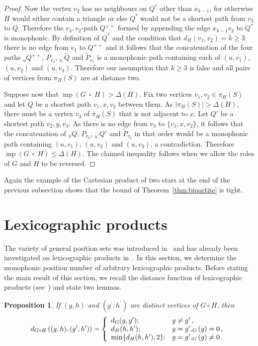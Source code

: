 \documentclass[12pt]{article}
\newtheorem{proposition}[theorem]{Proposition}
\DeclareMathOperator {\mono} {mp}
\let\deg\relax
\DeclareMathOperator {\deg} {deg}
\DeclareMathOperator{\cp}{\,\square\,}
\begin{document}
\begin{proof}
Now the vertex $v_2$ has no neighbours on $Q^*$ other than $x_{k-1}$, for otherwise $H$ would either contain a triangle or else $Q^*$ would not be a shortest path from $v_3$ to $Q$. Therefore the $v_3,v_2$-path $Q^{++}$ formed by appending the edge $x_{k-1}v_2$ to $Q^*$ is monophonic. By definition of $Q^*$ and the condition that $d_H(v_1,v_2) = k \geq 3$ there is no edge from $v_1$ to $Q^{++}$ and it follows that the concatenation of the four paths $_uQ^{++}$, $P_{v_2}$, $_{u^{\prime }}\widetilde{Q}$ and $\widetilde{P}_{v_1}$ is a monophonic path containing each of $(u,v_1)$, $(u,v_2)$ and $(u,v_3)$. Therefore our assumption that $k \geq 3$ is false and all pairs of vertices from $\pi _H(S)$ are at distance two.

Suppose now that $\mono (G \cp H) > \Delta (H)$. Fix two vertices $v_1,v_2 \in \pi _H(S)$ and let $Q$ be a shortest path $v_1,x,v_2$ between them. As $|\pi _H(S)| > \Delta (H)$, there must be a vertex $v_3$ of $\pi _H(S)$ that is not adjacent to $x$. Let $Q'$ be a shortest path $v_2,y,v_3$. As there is no edge from $v_3$ to $\{ v_1,x,v_2\} $, it follows that the concatenation of $_uQ$, $P_{v_2}$, $_{u^{\prime }}Q'$ and $\widetilde{P}_{v_3}$ in that order would be a monophonic path containing $(u,v_1)$, $(u,v_2)$ and $(u,v_3)$, a contradiction. Therefore $\mono (G \cp H) \leq \Delta (H)$. The claimed inequality follows when we allow the roles of $G$ and $H$ to be reversed.
\end{proof}

Again the example of the Cartesian product of two stars at the end of the previous subsection shows that the bound of Theorem~\ref{thm:bipartite} is tight. 


\section{Lexicographic products}\label{sec:Lexicographic products}

The variety of general position sets was introduced in~\cite{Tian-2025} and has already been investigated on lexicographic products in~\cite{Dokyeesun-2024b}. In this section, we determine the monophonic position number of arbitrary lexicographic products. Before stating the main result of this section, we recall the distance function of lexicographic products (see~\cite[Proposition 5.12]{hik-2011}) and state two lemmas.  

\begin{proposition}
\label{prop:Products:LexDist1}
If $(g,h)$ and $(g^{\prime},h^{\prime})$ are distinct vertices of $G\circ H$, then
$$d_{G\circ H}\left((g,h),(g^{\prime},h^{\prime})\right)=
\left\{\begin{array}{ll}
d_G(g,g^{\prime}); & \mbox{$g\ne g^{\prime}$}\,,\\
d_H(h,h^{\prime}); & g=g^{\prime}, \deg_G(g)=0\,,\\
\min\{d_H(h,h^{\prime}), 2\}; & g=g^{\prime}, \deg_G(g)\ne 0\,.\\
\end{array}\right.$$
\end{proposition}
\end{document}
